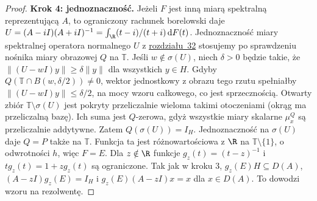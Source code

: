\begin{proof}
\textbf{Krok 4: jednoznaczność.}
Jeżeli $F$ jest inną miarą spektralną reprezentującą $A$,
to ograniczony rachunek borelowski daje
$U=(A-iI)(A+iI)^{-1}=\int_\R (t-i)/(t+i)\,\mathrm dF(t)$.
Jednoznaczność miary spektralnej operatora normalnego
$U$ z \hyperref[sec:spectral-hilbert32]{rozdziału~32}
stosujemy po sprawdzeniu nośnika miary obrazowej $Q$ na $\mathbb T$.
Jeśli $w\notin\sigma(U)$, niech $\delta>0$ będzie takie, że
$\|(U-wI)y\|\ge\delta\|y\|$ dla wszystkich $y\in H$.
Gdyby $Q(\mathbb T\cap B(w,\delta/2))\ne0$, wektor jednostkowy
z obrazu tego rzutu spełniałby $\|(U-wI)y\|\le\delta/2$,
na mocy wzoru całkowego, co jest sprzecznością.
Otwarty zbiór $\mathbb T\setminus\sigma(U)$ jest pokryty
przeliczalnie wieloma takimi otoczeniami (okrąg ma przeliczalną bazę).
Ich suma jest $Q$-zerowa, gdyż wszystkie miary skalarne $\mu_x^Q$
są przeliczalnie addytywne. Zatem $Q(\sigma(U))=I_H$.
Jednoznaczność na $\sigma(U)$ daje $Q=P$ także na $\mathbb T$.
Funkcja ta jest różnowartościowa z $\R$ na
$\mathbb T\setminus\{1\}$, o odwrotności $h$, więc $F=E$.
Dla $z\notin\R$ funkcje $g_z(t)=(t-z)^{-1}$ i $tg_z(t)=1+zg_z(t)$
są ograniczone. Tak jak w kroku 3, $g_z(E)H\subseteq D(A)$,
$(A-zI)g_z(E)=I_H$ i $g_z(E)(A-zI)x=x$ dla $x\in D(A)$.
To dowodzi wzoru na rezolwentę.
\end{proof}

